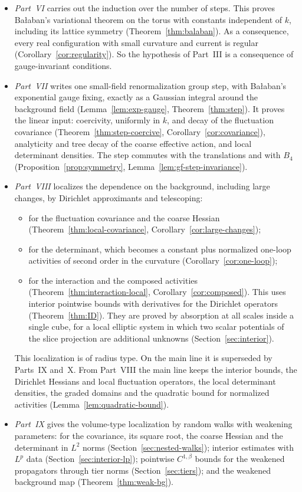 \begin{itemize}
\item \emph{Part~VI} carries out the induction over the number of steps. This proves Ba\l aban's variational theorem on the torus with constants independent of $k$, including its lattice symmetry (Theorem~\ref{thm:balaban}). As a consequence, every real configuration with small curvature and current is regular (Corollary~\ref{cor:regularity}). So the hypothesis of Part~III is a consequence of gauge-invariant conditions.
\item \emph{Part~VII} writes one small-field renormalization group step, with Ba\l aban's exponential gauge fixing, exactly as a Gaussian integral around the background field (Lemma~\ref{lem:exp-gauge}, Theorem~\ref{thm:step}). It proves the linear input: coercivity, uniformly in $k$, and decay of the fluctuation covariance (Theorem~\ref{thm:step-coercive}, Corollary~\ref{cor:covariance}), analyticity and tree decay of the coarse effective action, and local determinant densities. The step commutes with the translations and with $B_4$ (Proposition~\ref{prop:symmetry}, Lemma~\ref{lem:gf-step-invariance}).
\item \emph{Part~VIII} localizes the dependence on the background, including large changes, by Dirichlet approximants and telescoping:
  \begin{itemize}
  \item for the fluctuation covariance and the coarse Hessian (Theorem~\ref{thm:local-covariance}, Corollary~\ref{cor:large-changes});
  \item for the determinant, which becomes a constant plus normalized one-loop activities of second order in the curvature (Corollary~\ref{cor:one-loop});
  \item for the interaction and the composed activities (Theorem~\ref{thm:interaction-local}, Corollary~\ref{cor:composed}). This uses interior pointwise bounds with derivatives for the Dirichlet operators (Theorem~\ref{thm:ID}). They are proved by absorption at all scales inside a single cube, for a local elliptic system in which two scalar potentials of the slice projection are additional unknowns (Section~\ref{sec:interior}).
  \end{itemize}
  This localization is of radius type. On the main line it is superseded by Parts~IX and~X. From Part~VIII the main line keeps the interior bounds, the Dirichlet Hessians and local fluctuation operators, the local determinant densities, the graded domains and the quadratic bound for normalized activities (Lemma~\ref{lem:quadratic-bound}).
\item \emph{Part~IX} gives the volume-type localization by random walks with weakening parameters: for the covariance, its square root, the coarse Hessian and the determinant in $L^2$ norms (Section~\ref{sec:nested-walks}); interior estimates with $L^p$ data (Section~\ref{sec:interior-lp}); pointwise $C^{1,\beta}$ bounds for the weakened propagators through tier norms (Section~\ref{sec:tiers}); and the weakened background map (Theorem~\ref{thm:weak-bg}).

\end{itemize}
